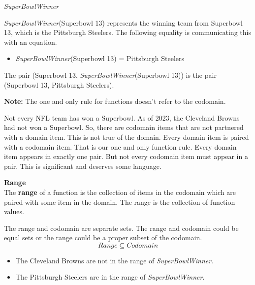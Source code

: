 \documentclass{ximera}
\begin{document}
\begin{example} \textit{SuperBowlWinner}


\textit{SuperBowlWinner}(Superbowl 13) represents the winning team from Superbowl 13, which is the Pittsburgh Steelers.  The following equality is communicating this with an equation.

\begin{itemize}
\item \textit{SuperBowlWinner}(Superbowl 13) = Pittsburgh Steelers  
\end{itemize}



The pair (Superbowl 13, \textit{SuperBowlWinner}(Superbowl 13)) is the pair (Superbowl 13, Pittsburgh Steelers). \

\end{example}

\textbf{Note:} The one and only rule for functions doesn't refer to the codomain.

Not every NFL team has won a Superbowl. As of 2023, the Cleveland Browns had not won a Superbowl.  So, there are codomain items that are not partnered with a domain item.  This is not true of the domain.  Every domain item is paired with a codomain item.  That is our one and only function rule.  Every domain item appears in exactly one pair.  But not every codomain item must appear in a pair.  This is significant and deserves some language.


\begin{definition} \textbf{\textcolor{green!50!black}{Range}} \\

The \textbf{range} of a function is the collection of items in the codomain which are paired with some item in the domain.  The range is the collection of function values.
\end{definition}

The range and codomain are separate sets.  The range and codomain could be equal sets or the range could be a proper subset of the codomain. \\

\[  Range \subseteq Codomain\]

\begin{itemize}
\item The Cleveland Browns are not in the range of \textit{SuperBowlWinner}.  
\item The Pittsburgh Steelers are in the range of \textit{SuperBowlWinner}.
\end{itemize}
\end{document}
